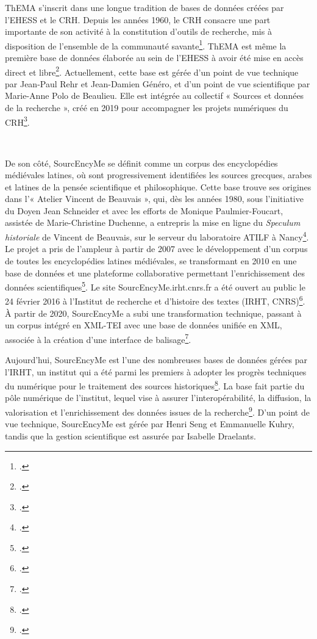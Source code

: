 \documentclass[a4paper,12pt,twoside]{book} %
\begin{document}
ThEMA s'inscrit dans une longue tradition de bases de données créées par l'EHESS et le CRH. Depuis les années 1960, le CRH consacre une part importante de son activité à la constitution d'outils de recherche, mis à disposition de l'ensemble de la communauté savante\footcite{BasesDonneesTextuelles}. ThEMA est même la première base de données élaborée au sein de l’EHESS à avoir été mise en accès direct et libre\footcite{InformationsThEMA}. Actuellement, cette base est gérée d'un point de vue technique par Jean-Paul Rehr et Jean-Damien Généro, et d'un point de vue scientifique par Marie-Anne Polo de Beaulieu. Elle est intégrée au collectif « Sources et données de la recherche », créé en 2019 pour accompagner les projets numériques du CRH\footcite{SourcesDonneesRecherche}.

\

De son côté, SourcEncyMe se définit comme un corpus des encyclopédies médiévales latines, où sont progressivement identifiées les sources grecques, arabes et latines de la pensée scientifique et philosophique. Cette base trouve ses origines dans l'« Atelier Vincent de Beauvais », qui, dès les années 1980, sous l'initiative du Doyen Jean Schneider et avec les efforts de Monique Paulmier-Foucart, assistée de Marie-Christine Duchenne, a entrepris la mise en ligne du \textit{Speculum historiale} de Vincent de Beauvais, sur le serveur du laboratoire ATILF à Nancy\footcite{SourcEncyMeSourcesEncyclopedies}. Le projet a pris de l'ampleur à partir de 2007 avec le développement d'un corpus de toutes les encyclopédies latines médiévales, se transformant en 2010 en une base de données et une plateforme collaborative permettant l'enrichissement des données scientifiques\footcite{kuhryQuelsTraitementsNumeriques2022}. Le site SourcEncyMe.irht.cnrs.fr a été ouvert au public le 24 février 2016 à l’Institut de recherche et d’histoire des textes (IRHT, CNRS)\footcite{draelantsEncyclopediesMedievalesMilieu2022}. À partir de 2020, SourcEncyMe a subi une transformation technique, passant à un corpus intégré en XML-TEI avec une base de données unifiée en XML, associée à la création d’une interface de balisage\footcite{draelantsEncyclopediesMedievalesMilieu2022}.

Aujourd'hui, SourcEncyMe est l'une des nombreuses bases de données gérées par l'IRHT, un institut qui a été parmi les premiers à adopter les progrès techniques du numérique pour le traitement des sources historiques\footcite{holtzIRHTAuFil2015}. La base fait partie du pôle numérique de l'institut, lequel vise à assurer l’interopérabilité, la diffusion, la valorisation et l’enrichissement des données issues de la recherche\footcite{PoleNumerique}. D'un point de vue technique, SourcEncyMe est gérée par Henri Seng et Emmanuelle Kuhry, tandis que la gestion scientifique est assurée par Isabelle Draelants.
\end{document}
